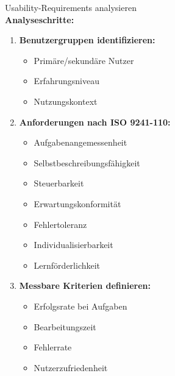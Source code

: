 \begin{KR}{Usability-Requirements analysieren}\\
\textbf{Analyseschritte:}
\begin{enumerate}
    \item \textbf{Benutzergruppen identifizieren:}
    \begin{itemize}
        \item Primäre/sekundäre Nutzer
        \item Erfahrungsniveau
        \item Nutzungskontext
    \end{itemize}
    
    \item \textbf{Anforderungen nach ISO 9241-110:}
    \begin{itemize}
        \item Aufgabenangemessenheit
        \item Selbstbeschreibungsfähigkeit
        \item Steuerbarkeit
        \item Erwartungskonformität
        \item Fehlertoleranz
        \item Individualisierbarkeit
        \item Lernförderlichkeit
    \end{itemize}
    
    \item \textbf{Messbare Kriterien definieren:}
    \begin{itemize}
        \item Erfolgsrate bei Aufgaben
        \item Bearbeitungszeit
        \item Fehlerrate
        \item Nutzerzufriedenheit
    \end{itemize}
\end{enumerate}
\end{KR}

